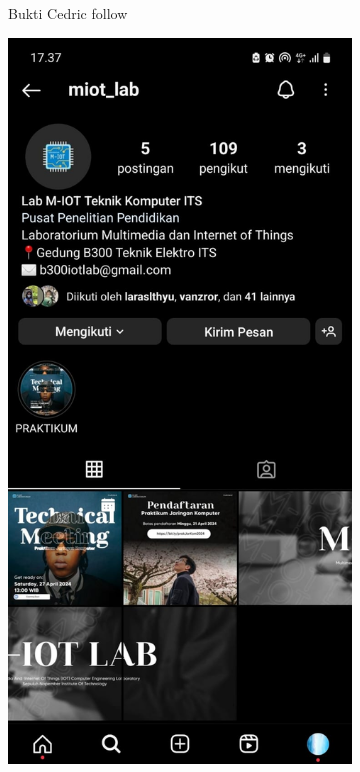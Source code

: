 \begin{enumerate}
\begin{figure}[H]
\begin{subfigure}{0.3\linewidth}
			\caption{Bukti Cedric follow}
			\label{fig:gambar35}
		\end{subfigure}
		\begin{subfigure}{0.3\linewidth}
			\centering
			\includegraphics[width=\linewidth]{P1/img/zafafollow.jpg}

\end{subfigure}
\end{figure}
\end{enumerate}
